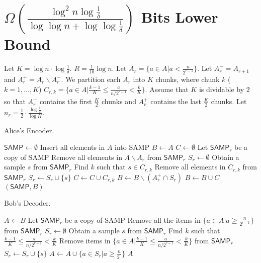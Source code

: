 \documentclass[10pt]{article}
\newcommand{\samp}{\textsf{SAMP}\xspace}
\newcommand{\enc}{\textsf{ENC}\xspace}
\newcommand{\dec}{\textsf{DEC}\xspace}
\begin{document}
\section{$\Omega(\frac{\log^2 n\log{\frac{1}{\delta}}}{\log\log n+\log\log \frac{1}{\delta}})$ Bits Lower Bound}

Let $K=\log n \cdot \log \frac{1}{\delta}$. $R=\frac{1}{10}\log n$. Let $A_r = \{a\in A|a<\frac{n}{2^{r-1}}\}$. Let $A_r^{-}=A_{r+1}$ and $A_r^{+}=A_r \backslash A_r^{-}$. We partition each $A_r$ into $K$ chunks, where chunk $k$ ($k=1,\ldots,K$) $C_{r,k}=\{a\in A|\frac{k-1}{K} \le \frac{a}{n/2^{r-1}} < \frac{k}{K} \}$. Assume that $K$ is dividable by $2$ so that $A_r^{-}$ contains the first $\frac{K}{2}$ chunks and $A_r^{+}$ contains the last $\frac{K}{2}$ chunks. Let $n_r=\frac{1}{2} \cdot \frac{\log \frac{1}{\delta}}{\log K}$.

\begin{algorithm}[H]
  \caption{Alice's Encoder.}
  \begin{algorithmic}[1]
    \Procedure{$\enc_4$}{$A$}
    \State $\samp \leftarrow \emptyset$
    \State Insert all elements in $A$ into \samp
    \State $B\leftarrow A$
    \State $C\leftarrow \emptyset$
      \State Let $\samp_r$ be a copy of \samp
      \State Remove all elements in $A\backslash A_r$ from $\samp_r$
      \State $S_r\leftarrow \emptyset$
        \State Obtain a sample $s$ from $\samp_r$
        \State Find $k$ such that $s\in C_{r,k}$
        \State Remove all elements in $C_{r,k}$ from $\samp_r$
        \State $S_r\leftarrow S_r \cup \{s\}$
          \State $C\leftarrow C \cup C_{r,k}$
        \EndIf
      \EndFor
      \State $B \leftarrow B \backslash (A_r^{+}\cap S_r)$
    \EndFor
    \State $B\leftarrow B \cup C$
    \State \Return $(\samp, B)$ 
    \EndProcedure
  \end{algorithmic}
\end{algorithm}


\begin{algorithm}[H]
  \caption{Bob's Decoder.}
  \begin{algorithmic}[1]
    \Procedure{$\dec_4$}{\samp, $B$}
    \State $A\leftarrow B$
    \State Let $\samp_r$ be a copy of \samp 
    \State Remove all the items in $\{a\in A|a\ge \frac{n}{2^{r-1}}\}$ from $\samp_r$
    \State $S_r\leftarrow \emptyset$
    \State Obtain a sample $s$ from $\samp_r$
    \State Find $k$ such that $\frac{k-1}{K} \le \frac{s}{n/2^{r-1}} < \frac{k}{K}$
    \State Remove items in $\{a\in A|\frac{k-1}{K} \le \frac{a}{n/2^{r-1}} < \frac{k}{K} \}$ from $\samp_r$
    \State $S_r\leftarrow S_r \cup \{s\}$
    \EndFor
    \State $A \leftarrow A \cup \{a\in S_r|a \ge \frac{n}{2^r}\}$
    \EndFor
    \State \Return $A$ 
    \EndProcedure
  \end{algorithmic}
\end{algorithm}
\end{document}
